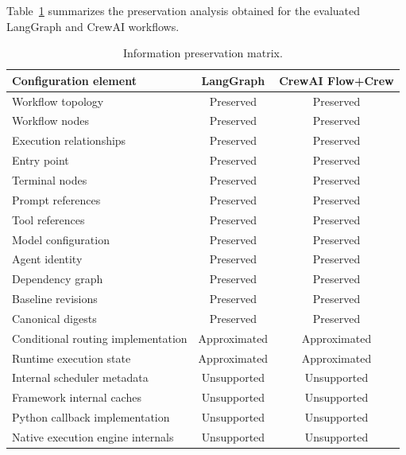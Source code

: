 \documentclass[10pt]{article}
\begin{document}
Table~\ref{tab:information_preservation} summarizes the preservation analysis obtained for the evaluated LangGraph and CrewAI workflows.

\begin{table}[t]
\centering
\caption{Information preservation matrix.}
\label{tab:information_preservation}
\begin{tabular}{lcc}
\toprule
Configuration element &
LangGraph &
CrewAI Flow+Crew \\
\midrule

Workflow topology &
Preserved &
Preserved \\

Workflow nodes &
Preserved &
Preserved \\

Execution relationships &
Preserved &
Preserved \\

Entry point &
Preserved &
Preserved \\

Terminal nodes &
Preserved &
Preserved \\

Prompt references &
Preserved &
Preserved \\

Tool references &
Preserved &
Preserved \\

Model configuration &
Preserved &
Preserved \\

Agent identity &
Preserved &
Preserved \\

Dependency graph &
Preserved &
Preserved \\

Baseline revisions &
Preserved &
Preserved \\

Canonical digests &
Preserved &
Preserved \\

Conditional routing implementation &
Approximated &
Approximated \\

Runtime execution state &
Approximated &
Approximated \\

Internal scheduler metadata &
Unsupported &
Unsupported \\

Framework internal caches &
Unsupported &
Unsupported \\

Python callback implementation &
Unsupported &
Unsupported \\

Native execution engine internals &
Unsupported &
Unsupported \\

\bottomrule
\end{tabular}
\end{table}
\end{document}
